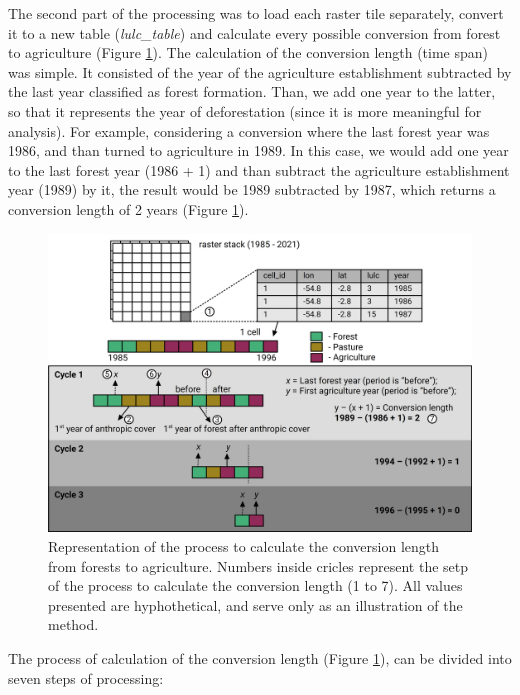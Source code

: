 \documentclass[essd, manuscript]{copernicus}
\begin{document}
The second part of the processing was to load each raster tile separately, convert it to a new table (\emph{lulc\_table}) and calculate every possible conversion from forest to agriculture (Figure \ref{fig:routine-plot}).
The calculation of the conversion length (time span) was simple.
It consisted of the year of the agriculture establishment subtracted by the last year classified as forest formation.
Than, we add one year to the latter, so that it represents the year of deforestation (since it is more meaningful for analysis).
For example, considering a conversion where the last forest year was 1986, and than turned to agriculture in 1989.
In this case, we would add one year to the last forest year (1986 + 1) and than subtract the agriculture establishment year (1989) by it, the result would be 1989 subtracted by 1987, which returns a conversion length of 2 years (Figure \ref{fig:routine-plot}).

\begin{figure}[h]
\includegraphics[width=17cm]{figs/change_lenght_routine_scheme} \caption{Representation of the process to calculate the conversion length from forests to agriculture. Numbers inside cricles represent the setp of the process to calculate the conversion length (1 to 7). All values presented are hyphothetical, and serve only as an illustration of the method.}\label{fig:routine-plot}
\end{figure}

The process of calculation of the conversion length (Figure \ref{fig:routine-plot}), can be divided into seven steps of processing:
\end{document}

